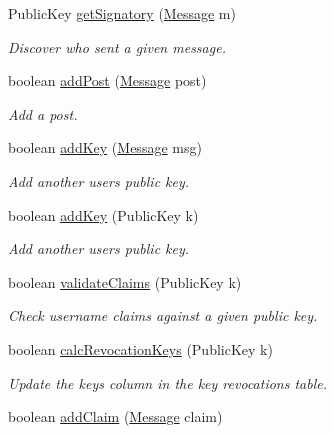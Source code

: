\begin{DoxyCompactItemize}
Public\-Key \hyperlink{classballmerpeak_1_1turtlenet_1_1server_1_1Database_a890f60c47e11af8823d48689fdeac360}{get\-Signatory} (\hyperlink{classballmerpeak_1_1turtlenet_1_1shared_1_1Message}{Message} m)
\begin{DoxyCompactList}\small\item\em Discover who sent a given message. \end{DoxyCompactList}\item 
boolean \hyperlink{classballmerpeak_1_1turtlenet_1_1server_1_1Database_a8456bb059a9438ecc03a8c65c2cf908a}{add\-Post} (\hyperlink{classballmerpeak_1_1turtlenet_1_1shared_1_1Message}{Message} post)
\begin{DoxyCompactList}\small\item\em Add a post. \end{DoxyCompactList}\item 
boolean \hyperlink{classballmerpeak_1_1turtlenet_1_1server_1_1Database_add2acddf62824bcedfe2724257ab0b04}{add\-Key} (\hyperlink{classballmerpeak_1_1turtlenet_1_1shared_1_1Message}{Message} msg)
\begin{DoxyCompactList}\small\item\em Add another users public key. \end{DoxyCompactList}\item 
boolean \hyperlink{classballmerpeak_1_1turtlenet_1_1server_1_1Database_a4641ac050b40864856bb7ab903fb96c2}{add\-Key} (Public\-Key k)
\begin{DoxyCompactList}\small\item\em Add another users public key. \end{DoxyCompactList}\item 
boolean \hyperlink{classballmerpeak_1_1turtlenet_1_1server_1_1Database_a1d9276229eb90ede286f8ecbee955248}{validate\-Claims} (Public\-Key k)
\begin{DoxyCompactList}\small\item\em Check username claims against a given public key. \end{DoxyCompactList}\item 
boolean \hyperlink{classballmerpeak_1_1turtlenet_1_1server_1_1Database_a222ba2352c2b9c48dd9c66470d106623}{calc\-Revocation\-Keys} (Public\-Key k)
\begin{DoxyCompactList}\small\item\em Update the keys column in the key revocations table. \end{DoxyCompactList}\item 
boolean \hyperlink{classballmerpeak_1_1turtlenet_1_1server_1_1Database_afc065fd588fdbd556bd2a013e648b43d}{add\-Claim} (\hyperlink{classballmerpeak_1_1turtlenet_1_1shared_1_1Message}{Message} claim)

\end{DoxyCompactItemize}
